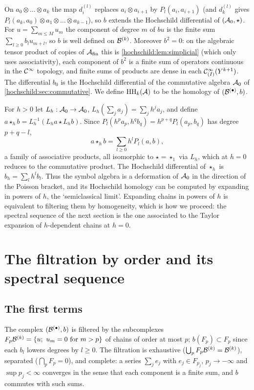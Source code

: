 On $a_0\otimes\dots\otimes a_k$ the map $d^{(l)}_i$ replaces
$a_i\otimes a_{i+1}$ by $P_l(a_i,a_{i+1})$ (and $d^{(l)}_k$ gives
$P_l(a_k,a_0)\otimes a_1\otimes\dots\otimes a_{k-1}$), so $b$ extends the
Hochschild differential of $(\mathcal{A}_0,\star)$. For $u=\sum_{m\le M}u_m$ the
component of degree $m$ of $bu$ is the finite sum $\sum_{l\ge0}b_lu_{m+l}$, so
$b$ is well defined on $\mathcal{B}^{(k)}$. Moreover $b^2=0$: on the algebraic tensor
product of copies of $\mathcal{A}_{\mathrm{fin}}$ this is \cref{hochschild:lem:simplicial}
(which only uses associativity), each component of $b^2$ is a finite sum of
operators continuous in the $\mathcal{C}^\infty$ topology, and finite sums of products are
dense in each $\mathcal{C}^\infty_{(I)}(Y^{k+1})$. The differential $b_0$ is the Hochschild
differential of the commutative algebra $\mathcal{A}_0$ of
\cref{hochschild:sec:commutative}. We define $\operatorname{HH}_k(\mathcal{A})$ to be the homology
of $(\mathcal{B}^{(\bullet)},b)$.

\begin{remark}\label{hochschild:rem:semiclassical}
For $h>0$ let $L_h:\mathcal{A}_0\to\mathcal{A}_0$, $L_h(\sum_ja_j)=\sum_jh^ja_j$, and define
$a\star_hb=L_h^{-1}(L_ha\star L_hb)$. Since $P_l(h^pa_p,h^qb_q)=h^{p+q}P_l(a_p,b_q)$
has degree $p+q-l$,
\begin{equation*}
  a\star_hb=\sum_{l\ge0}h^lP_l(a,b),
\end{equation*}
a family of associative products, all isomorphic to $\star=\star_1$ via
$L_h$, which at $h=0$ reduces to the commutative product. The Hochschild
differential of $\star_h$ is $b_h=\sum_lh^lb_l$. Thus the symbol algebra is
a deformation of $\mathcal{A}_0$ in the direction of the Poisson bracket, and its
Hochschild homology can be computed by expanding in powers of $h$, the
`semiclassical limit'. Expanding chains in powers of $h$ is equivalent to
filtering them by homogeneity, which is how we proceed: the spectral sequence
of the next section is the one associated to the Taylor expansion of
$h$-dependent chains at $h=0$.
\end{remark}

\section{The filtration by order and its spectral sequence}\label{hochschild:sec:spectral}

\subsection{The first terms}
The complex $(\mathcal{B}^{(\bullet)},b)$ is filtered by the subcomplexes
$F_p\mathcal{B}^{(k)}=\{u;\ u_m=0\text{ for }m>p\}$ of chains of order at most $p$;
$b(F_p)\subset F_p$ since each $b_l$ lowers degrees by $l\ge0$. The filtration
is exhaustive ($\bigcup_pF_p\mathcal{B}^{(k)}=\mathcal{B}^{(k)}$), separated
($\bigcap_pF_p=0$), and complete: a series $\sum_je_j$ with
$e_j\in F_{p_j}$, $p_j\to-\infty$ and $\sup p_j<\infty$ converges in the sense
that each component is a finite sum, and $b$ commutes with such sums.

